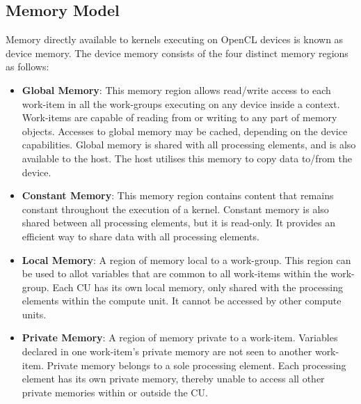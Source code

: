 \subsection{Memory Model}
Memory directly available to kernels executing on OpenCL devices is known as device memory. The device memory consists of the four distinct memory regions as follows: 
\begin{itemize}
\item \textbf{Global Memory}: This memory region allows read/write access to each work-item in all the work-groups executing on any device inside a context. Work-items are capable of reading from or writing to any part of memory objects. Accesses to global memory may be cached, depending on the device capabilities. \newline\newline
Global memory is shared with all processing elements, and is also available to the host. The host utilises this memory to copy data to/from the device.

\item \textbf{Constant Memory}: This memory region contains content that remains constant throughout the execution of a kernel. \newline\newline
Constant memory is also shared between all processing elements, but it is read-only. It provides an efficient way to share data with all processing elements.

\item \textbf{Local Memory}: A region of memory local to a work-group. This region can be used to allot variables that are common to all work-items within the work-group.\newline\newline
Each CU has its own local memory, only shared with the processing elements within the compute unit. It cannot be accessed by other compute units. 

\item \textbf{Private Memory}: A region of memory private to a work-item. Variables declared in one work-item’s private memory are not seen to another work-item.\newline\newline
Private memory belongs to a sole processing element. Each processing element has its own private memory, thereby unable to access all other private memories within or outside the CU.


\end{itemize}
